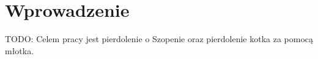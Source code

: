 \chapter{Wprowadzenie} %
\label{cha:wprowadzenie}

TODO: Celem pracy jest pierdolenie o Szopenie oraz pierdolenie kotka za pomocą młotka.
